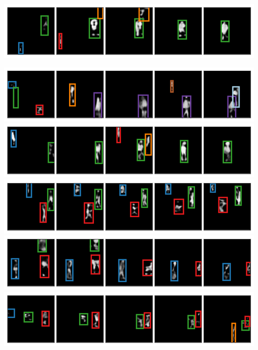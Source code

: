 \begin{center}
\begin{minipage}[c]{0.49\linewidth}
        \includegraphics[width=\linewidth]{figures/SQAIR/duke_sample/000062.png}
    \end{minipage}
    \hfill
    \begin{minipage}[c]{0.49\linewidth}
        \centering
            \includegraphics[width=\linewidth]{figures/SQAIR/duke_sample/000225.png}
        \includegraphics[width=\linewidth]{figures/SQAIR/duke_sample/000121.png}
        \includegraphics[width=\linewidth]{figures/SQAIR/duke_sample/000128.png}
        \includegraphics[width=\linewidth]{figures/SQAIR/duke_sample/000132.png}
        \includegraphics[width=\linewidth]{figures/SQAIR/duke_sample/000134.png}

\end{minipage}
\end{center}
